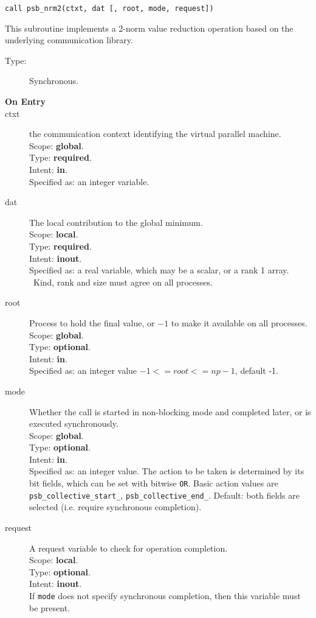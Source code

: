 \begin{verbatim}
call psb_nrm2(ctxt, dat [, root, mode, request])
\end{verbatim}

This subroutine implements a 2-norm value reduction 
operation based on the underlying communication library. 
\begin{description}
\item[Type:] Synchronous.
\item[\bf  On Entry ]
\item[ctxt] the communication context identifying the virtual
  parallel machine.\\
Scope: {\bf global}.\\
Type: {\bf required}.\\
Intent: {\bf in}.\\
Specified as: an integer variable.
\item[dat] The local contribution to the global minimum.\\
Scope: {\bf local}.\\
Type: {\bf required}.\\
Intent: {\bf inout}.\\
Specified as: a real variable, which may be a
scalar, or a rank 1 array. \
Kind, rank and size must agree on all processes.
\item[root] Process to hold the final value, or $-1$ to make it available
  on all processes.\\
Scope: {\bf global}.\\
Type: {\bf optional}.\\
Intent: {\bf in}.\\
Specified as: an integer value $-1<= root <= np-1$, default -1. \\
\item[mode] Whether the call is started in non-blocking mode and completed
  later, or is executed synchronously.\\
Scope: {\bf global}.\\
Type: {\bf optional}.\\
Intent: {\bf in}.\\
Specified as: an integer value. The action to be taken is determined
by its bit fields, which can be set with bitwise \verb|OR|. Basic
action values are \verb|psb_collective_start_|, \verb|psb_collective_end_|.
Default:  both fields are selected (i.e. require synchronous completion).\\
\item[request] A request variable to check for operation completion.\\
Scope: {\bf local}.\\
Type: {\bf optional}.\\
Intent: {\bf inout}.\\
If \verb|mode| does not specify synchronous completion, then this
variable must be present.
\end{description}


